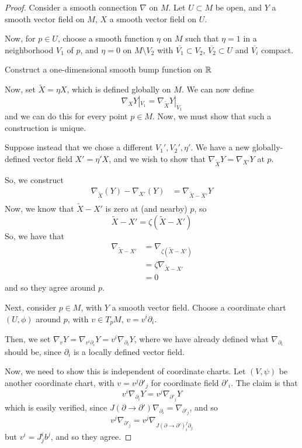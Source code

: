 \documentclass[../main.tex]{subfiles}
\begin{document}
\begin{proof}
    Consider a smooth connection $\nabla$ on $M$. Let $U\subset M$ be open, and
    $Y$ a smooth vector field on $M$, $X$ a smooth vector field on $U$. 

    Now, for $p\in U$, choose a smooth function $\eta$ on $M$ such that $\eta=1$
    in a neighborhood $V_1$ of $p$, and $\eta=0$ on $M\setminus V_2$ with
    $\overline{V_1}\subset V_2$, $\overline{V_2}\subset U$ and $\overline{V_i}$
    compact.

    \begin{hw}
        Construct a one-dimensional smooth bump function on $\mathbb{R}$
    \end{hw}

    Now, set $\tilde{X}=\eta X$, which is defined globally on $M$.
    We can now define
    \[
        \nabla_XY|_{V_1} = \nabla_{\tilde{X}}Y|_{V_1}
    \]
    and we can do this for every point $p\in M$. Now, we must show that such a
    construction is unique. 
    
    Suppose instead that we chose a different $V_1',V_2',\eta'$. We have a new
    globally-defined vector field $X'=\eta' X$, and we wish to show that
    $\nabla_{\tilde{X}}Y = \nabla_{X'}Y$ at $p$.

    So, we construct
    \[
        \begin{aligned}
            \nabla_{\tilde{X}}(Y) - \nabla_{X'}(Y) &= \nabla_{\tilde{X}-X'}Y\\
        \end{aligned}
    \]
    Now, we know that $\tilde{X}-X'$ is zero at (and nearby) $p$, so
    \[
        \tilde{X} -X' = \zeta(\tilde{X}-X')
    \]
    So, we have that
    \[
        \begin{aligned}
            \nabla_{\tilde{X}-X'} &= \nabla_{\zeta(\tilde{X}-X')}\\
            &= \zeta\nabla_{\tilde{X}-X'}\\
            &=0
        \end{aligned}
    \]
    and so they agree around $p$.

    Next, consider $p\in M$, with $Y$ a smooth vector field. Choose a coordinate
    chart $(U,\phi)$ around $p$, with $v\in T_pM$, $v = v^i\partial_i$.

    Then, we set $\nabla_v Y = \nabla_{v^i\partial_i}Y =
    v^i\nabla_{\partial_i}Y$, where we have already defined what
    $\nabla_{\partial_i}$ should be, since $\partial_i$ is a locally defined
    vector field.

    Now, we need to show this is independent of coordinate charts. Let
    $(V,\psi)$ be another coordinate chart, with $v = v^j\partial'_j$ for
    coordinate field $\partial'_i$. The claim is that
    \[
        v^i\nabla_{\partial_i}Y = v^j\nabla_{\partial'_j}Y
    \]
    which is easily verified, since $J(\partial\to\partial')\nabla_{\partial_i}
    = \nabla_{\partial'_j}$, and so
    \[
        v^j\nabla_{\partial'_j} = v^j\nabla_{J(\partial\to\partial')^j_i\partial_j}
    \]
    but $v^i = J^i_jb^j$, and so they agree.
\end{proof}
\end{document}
